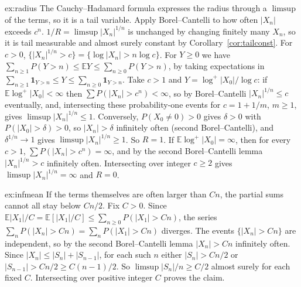\begin{solution}{ex:radius}
\idea The Cauchy--Hadamard formula expresses the radius through a $\limsup$ of the terms, so it is a tail variable. Apply Borel--Cantelli to how often
$|X_n|$ exceeds $c^n$.
\writeup $1/R=\limsup|X_n|^{1/n}$ is unchanged by changing finitely many $X_n$, so it is tail measurable and almost surely constant by
Corollary~\ref{cor:tailconst}. For $c>0$, $\{|X_n|^{1/n}>c\}=\{\log|X_n|>n\log c\}$. For $Y\ge0$ we have $\sum_{n\ge1}P(Y>n)\le\mathbb E Y\le
\sum_{n\ge0}P(Y>n)$, by taking expectations in $\sum_{n\ge1}\mathbf 1_{Y>n}\le Y\le\sum_{n\ge0}\mathbf 1_{Y>n}$. Take $c>1$ and $Y=\log^+|X_0|/\log c$: if $\mathbb E\log^+|X_0|<\infty$ then $\sum P(|X_n|>c^n)<\infty$, so by
Borel--Cantelli $|X_n|^{1/n}\le c$ eventually, and, intersecting these probability-one events for $c=1+1/m$, $m\ge1$, gives $\limsup|X_n|^{1/n}\le1$. Conversely, $P(X_0\ne0)>0$ gives $\delta>0$ with $P(|X_0|>\delta)>0$,
so $|X_n|>\delta$ infinitely often (second Borel--Cantelli), and $\delta^{1/n}\to1$ gives $\limsup|X_n|^{1/n}\ge1$. So $R=1$. If
$\mathbb E\log^+|X_0|=\infty$, then for every $c>1$, $\sum P(|X_n|>c^n)=\infty$, and by the second Borel--Cantelli lemma $|X_n|^{1/n}>c$
infinitely often. Intersecting over integer $c\ge2$ gives $\limsup|X_n|^{1/n}=\infty$ and $R=0$.
\end{solution}

\begin{solution}{ex:infmean}
\idea If the terms themselves are often larger than $Cn$, the partial sums cannot all stay below $Cn/2$.
\writeup Fix $C>0$. Since $\mathbb E|X_1|/C=\mathbb E[|X_1|/C]\le\sum_{n\ge0}P(|X_1|>Cn)$, the series $\sum_nP(|X_n|>Cn)=\sum_nP(|X_1|>Cn)$ diverges.
The events $\{|X_n|>Cn\}$ are independent, so by the second Borel--Cantelli lemma $|X_n|>Cn$ infinitely often. Since $|X_n|\le|S_n|+|S_{n-1}|$,
for each such $n$ either $|S_n|>Cn/2$ or $|S_{n-1}|>Cn/2\ge C(n-1)/2$. So $\limsup|S_n|/n\ge C/2$ almost surely for each fixed $C$. Intersecting over positive integer $C$ proves the claim.
\end{solution}

